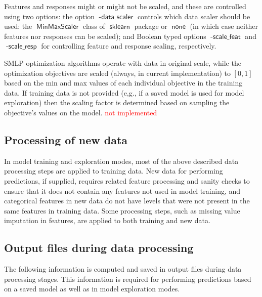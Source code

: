 \documentclass[a4paper,parskip=half]{article} %
\newcommand*\option[1]{\operatorname{\mathsf{#1}}} %
\newcommand*\package[1]{\operatorname{\mathsf{#1}}} %
\newcommand\todozk[1]{\textcolor{red}{#1}}
\newcommand*\ZK{\todozk}
\begin{document}
Features and responses might or might not be scaled, and these are controlled using two options:
the option $\option{-data\_scaler}$  controls which data scaler should be used: the $\option{MinMaxScaler}$ 
class of $\package{sklearn}$ package or $\option{none}$  (in which case neither features nor responses can be scaled); 
and Boolean typed options $\option{-scale\_feat}$ and $\option{-scale\_resp}$ for controlling feature and 
response scaling, respectively.

SMLP optimization algorithms operate with data in original scale, while the optimization objectives are scaled 
(always,  in current implementation) to $[0,1]$ based on the min and max values of each individual objective 
in the training data. If training data is not provided (e,g., if a saved model is used for model exploration) then
the scaling factor is determined based on sampling the objective's values on the model. \ZK{not implemented}

\subsection{Processing of new data}

In model training and exploration modes, most of the above described data processing steps are applied to 
training data. New data for performing predictions, if supplied, requires related feature processing and sanity 
checks to ensure that it does not contain any features not used in model training, and categorical features
in new data do not have levels that were not present in the same features in training data.
Some processing steps, such as missing value imputation in features, are applied to both training and
new data.


\subsection{Output files during data processing}\label{sec:data:outputs}

The following information is computed and saved in output files during data processing stages.
This information is required for performing predictions based on a saved model as well as in
model exploration modes.
\end{document}
